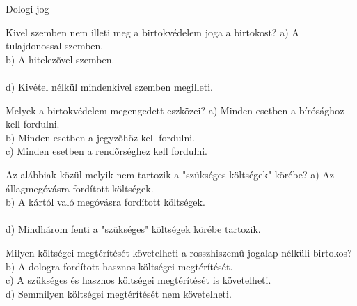 \begin{frame}[plain]
\begin{tcolorbox}[center, colback={myyellow}, coltext={black}, colframe={myyellow}]
    { Dologi jog}\\
\end{tcolorbox}
\end{frame}

\begin{frame}


\begin{tcolorbox}[title={111. Kérdés}]
Kivel szemben nem illeti meg a birtokvédelem joga a birtokost?
\tcblower
a) A tulajdonossal szemben.\\
b) A hitelezõvel szemben.\\
\\
d) Kivétel nélkül mindenkivel szemben megilleti.
\end{tcolorbox}

\begin{tcolorbox}[title={112. Kérdés}]
Melyek a birtokvédelem megengedett eszközei?
\tcblower
a) Minden esetben a bírósághoz kell fordulni.\\
b) Minden esetben a jegyzõhöz kell fordulni.\\
c) Minden esetben a rendõrséghez kell fordulni.\\
\end{tcolorbox}

\begin{tcolorbox}[title={113. Kérdés}]
Az alábbiak közül melyik nem tartozik a "szükséges költségek" körébe?
\tcblower
a) Az állagmegóvásra fordított költségek.\\
b) A kártól való megóvásra fordított költségek.\\
\\
d) Mindhárom fenti a "szükséges" költségek körébe tartozik.
\end{tcolorbox}

\begin{tcolorbox}[title={114. Kérdés}]
Milyen költségei megtérítését követelheti a rosszhiszemû jogalap nélküli birtokos?
\tcblower
{}\\
b) A dologra fordított hasznos költségei megtérítését.\\
c) A szükséges és hasznos költségei megtérítését is követelheti.\\
d) Semmilyen költségei megtérítését nem követelheti.
\end{tcolorbox}

\end{frame}


